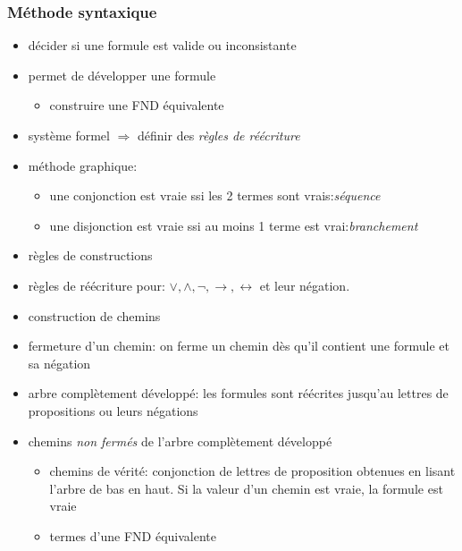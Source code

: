 \documentclass[10pt,a4paper]{article}
\begin{document}
		\subsubsection{Méthode syntaxique}
			\begin{itemize}
				\item décider si une formule est valide ou inconsistante
				\item permet de développer une formule
				\begin{itemize}
					\item construire une FND équivalente
				\end{itemize}
				\item système formel $\Rightarrow$ définir des \emph{règles de réécriture}
				\item méthode graphique:
				\begin{itemize}
					\item une conjonction est vraie ssi les 2 termes sont vrais:\emph{séquence}
					\item une disjonction est vraie ssi au moins 1 terme est vrai:\emph{branchement}
				\end{itemize}
				\item règles de constructions
				\item règles de réécriture pour: $\vee,\wedge,\neg,\rightarrow,\leftrightarrow$ et leur négation.
				\item construction de chemins
				\item fermeture d'un chemin: on ferme un chemin dès qu'il contient une formule et sa négation
				\item arbre complètement développé: les formules sont réécrites jusqu'au lettres de propositions ou leurs négations
				\item chemins \emph{non fermés} de l'arbre complètement développé
				\begin{itemize}
					\item chemins de vérité: conjonction de lettres de proposition obtenues en lisant l'arbre de bas en haut. Si la valeur d'un chemin est vraie, la formule est vraie
					\item termes d'une FND équivalente
				\end{itemize}
			\end{itemize}
\end{document}
